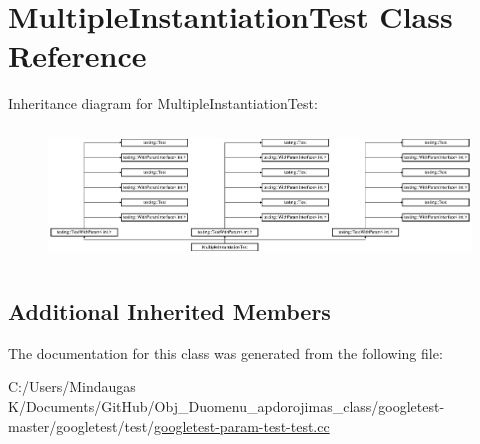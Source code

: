 \hypertarget{class_multiple_instantiation_test}{}\section{Multiple\+Instantiation\+Test Class Reference}
\label{class_multiple_instantiation_test}
Inheritance diagram for Multiple\+Instantiation\+Test\+:\begin{figure}[H]
\begin{center}
\leavevmode
\includegraphics[height=3.572568cm]{dd/d68/class_multiple_instantiation_test}
\end{center}
\end{figure}
\subsection*{Additional Inherited Members}


The documentation for this class was generated from the following file\+:\begin{DoxyCompactItemize}
\item 
C\+:/\+Users/\+Mindaugas K/\+Documents/\+Git\+Hub/\+Obj\+\_\+\+Duomenu\+\_\+apdorojimas\+\_\+class/googletest-\/master/googletest/test/\mbox{\hyperlink{googletest-master_2googletest_2test_2googletest-param-test-test_8cc}{googletest-\/param-\/test-\/test.\+cc}}\end{DoxyCompactItemize}
